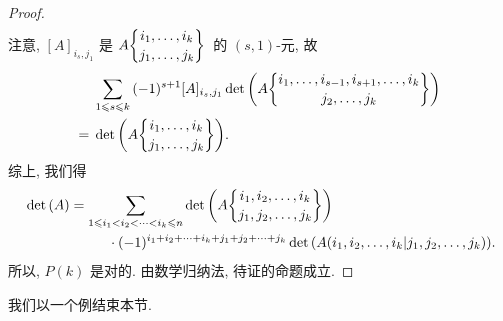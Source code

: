 \documentclass[../libro.tex]{subfiles}
\begin{document}
\begin{proof}
\begin{align*}
    \end{align*}
    注意, \([A]_{i_s,j_1}\) 是
    \(A\submat{i_1, \dots, i_k}
    {j_1, \dots, j_k}\)~的
    \((s, 1)\)-元, 故
    \begin{align*}
        & \sum_{1 \leq s \leq k}
        {(-1)^{s+1} [A]_{i_s,j_1}
            \det {\left(
                    A\submat{i_1, \dots, i_{s-1}, i_{s+1}, \dots, i_k}
                    {j_2, \dots, j_k}
        \right)}}
        \\
        = {} & \det {\left(
                A\submat{i_1, \dots, i_k}
                {j_1, \dots, j_k}
        \right)}.
    \end{align*}
    综上, 我们得
    \begin{align*}
        &
        \det {(A)}
        = \sum_{1 \leq i_1 < i_2 < \dots < i_k \leq n}
        {\det {\left(
                    A\submat{i_1, i_2, \dots, i_k}
                    {j_1, j_2, \dots, j_k}
        \right)}}
        \\
        &
        \qquad \qquad \qquad
        \cdot (-1)^{i_1 + i_2 + \dots + i_k
        + j_1 + j_2 + \dots + j_k}
        \det {(A({i_1,i_2,\dots,i_k}|{j_1,j_2,\dots,j_k}))}.
    \end{align*}
    所以, \(P(k)\) 是对的.
    由数学归纳法, 待证的命题成立.
\end{proof}

我们以一个例结束本节.
\end{document}
